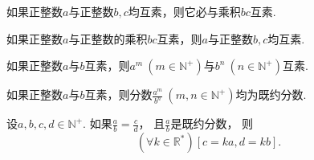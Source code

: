 \begin{theorem}
如果正整数\(a\)与正整数\(b,c\)均互素，则它必与乘积\(bc\)互素.
\end{theorem}
\begin{corollary}
如果正整数\(a\)与正整数的乘积\(bc\)互素，则\(a\)与正整数\(b,c\)均互素.
\end{corollary}
\begin{corollary}
如果正整数\(a\)与\(b\)互素，则\(a^m\ (m\in\mathbb{N}^+)\)与\(b^n\ (n\in\mathbb{N}^+)\)互素.
\end{corollary}

\begin{theorem}
如果正整数\(a\)与\(b\)互素，则分数\(\frac{a^m}{b^n}\ (m,n\in\mathbb{N}^+)\)均为既约分数.
\end{theorem}
\begin{corollary}
设\(a,b,c,d\in\mathbb{N}^+\).
如果\(\frac{a}{b} = \frac{c}{d}\)，
且\(\frac{a}{b}\)是既约分数，
则\begin{equation*}
	(\forall k\in\mathbb{R}^*)
	[c = ka, d = kb].
\end{equation*}
\end{corollary}

